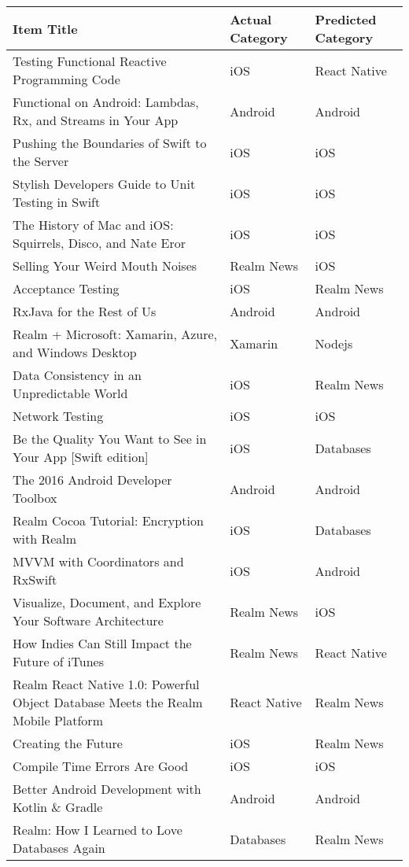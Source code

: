 \documentclass[letterpaper,11pt]{article}
\begin{document}
\begin{table}[h]
\centering
\begin{adjustbox}{max width=\linewidth}
\begin{tabular}{ | l | l | l |}
\hline
\textbf{Item Title} & \textbf{Actual Category} & \textbf{Predicted Category} \\
\hline
Testing Functional Reactive Programming Code & iOS & React Native \\ 
Functional on Android: Lambdas, Rx, and Streams in Your App & Android & Android \\ 
Pushing the Boundaries of Swift to the Server & iOS & iOS \\ 
Stylish Developers Guide to Unit Testing in Swift & iOS & iOS \\ 
The History of Mac and iOS: Squirrels, Disco, and Nate Eror & iOS & iOS \\ 
Selling Your Weird Mouth Noises & Realm News & iOS \\ 
Acceptance Testing & iOS & Realm News \\ 
RxJava for the Rest of Us & Android & Android \\ 
Realm + Microsoft: Xamarin, Azure, and Windows Desktop & Xamarin & Nodejs \\ 
Data Consistency in an Unpredictable World & iOS & Realm News \\ 
Network Testing & iOS & iOS \\ 
Be the Quality You Want to See in Your App [Swift edition] & iOS & Databases \\ 
The 2016 Android Developer Toolbox & Android & Android \\ 
Realm Cocoa Tutorial: Encryption with Realm & iOS & Databases \\ 
MVVM with Coordinators and RxSwift & iOS & Android \\ 
Visualize, Document, and Explore Your Software Architecture & Realm News & iOS \\ 
How Indies Can Still Impact the Future of iTunes & Realm News & React Native \\ 
Realm React Native 1.0: Powerful Object Database Meets the Realm Mobile Platform & React Native & Realm News \\ 
Creating the Future & iOS & Realm News \\ 
Compile Time Errors Are Good & iOS & iOS \\ 
Better Android Development with Kotlin \& Gradle & Android & Android \\ 
Realm: How I Learned to Love Databases Again & Databases & Realm News \\ 

\end{tabular}
\end{adjustbox}
\end{table}
\end{document}
